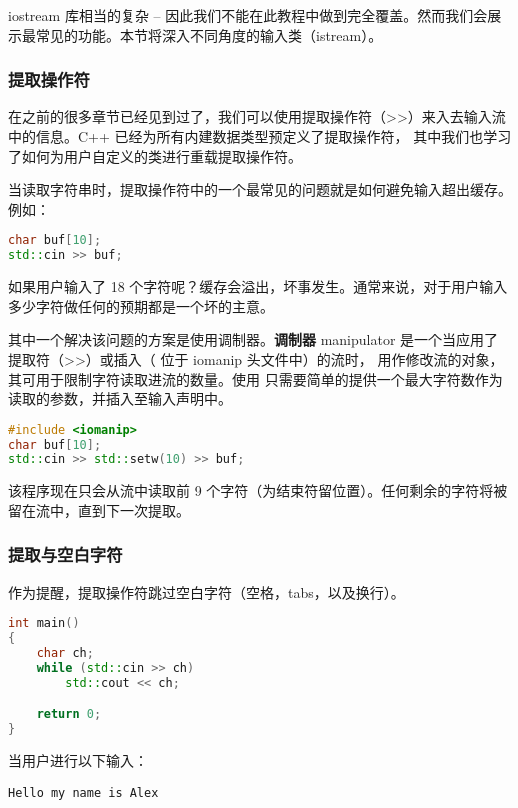 \documentclass[../../LearnCpp.tex]{subfiles}
\begin{document}

iostream 库相当的复杂 -- 因此我们不能在此教程中做到完全覆盖。然而我们会展示最常见的功能。本节将深入不同角度的输入类（istream）。

\subsubsection*{提取操作符}

在之前的很多章节已经见到过了，我们可以使用提取操作符（>>）来入去输入流中的信息。C++ 已经为所有内建数据类型预定义了提取操作符，
其中我们也学习了如何为用户自定义的类进行重载提取操作符。

当读取字符串时，提取操作符中的一个最常见的问题就是如何避免输入超出缓存。例如：

\begin{lstlisting}[language=C++]
char buf[10];
std::cin >> buf;
\end{lstlisting}

如果用户输入了 18 个字符呢？缓存会溢出，坏事发生。通常来说，对于用户输入多少字符做任何的预期都是一个坏的主意。

其中一个解决该问题的方案是使用调制器。\textbf{调制器} manipulator 是一个当应用了提取符（>>）或插入（ 位于 iomanip 头文件中）的流时，
用作修改流的对象，其可用于限制字符读取进流的数量。使用  只需要简单的提供一个最大字符数作为读取的参数，并插入至输入声明中。

\begin{lstlisting}[language=C++]
#include <iomanip>
char buf[10];
std::cin >> std::setw(10) >> buf;
\end{lstlisting}

该程序现在只会从流中读取前 9 个字符（为结束符留位置）。任何剩余的字符将被留在流中，直到下一次提取。

\subsubsection*{提取与空白字符}

作为提醒，提取操作符跳过空白字符（空格，tabs，以及换行）。

\begin{lstlisting}[language=C++]
int main()
{
    char ch;
    while (std::cin >> ch)
        std::cout << ch;

    return 0;
}
\end{lstlisting}

当用户进行以下输入：

\begin{lstlisting}
Hello my name is Alex
\end{lstlisting}
\end{document}
